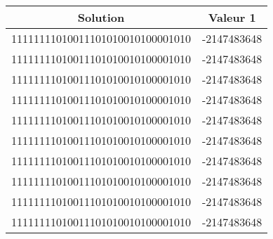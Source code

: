 \documentclass[a4paper,11pt]{article}
\begin{document}
	\begin{center}\begin{tabular}{|c|c|}
	\hline Solution & Valeur 1\\
	\hline 11111111010011101010010100001010 & -2147483648\\
	\hline 11111111010011101010010100001010 & -2147483648\\
	\hline 11111111010011101010010100001010 & -2147483648\\
	\hline 11111111010011101010010100001010 & -2147483648\\
	\hline 11111111010011101010010100001010 & -2147483648\\
	\hline 11111111010011101010010100001010 & -2147483648\\
	\hline 11111111010011101010010100001010 & -2147483648\\
	\hline 11111111010011101010010100001010 & -2147483648\\
	\hline 11111111010011101010010100001010 & -2147483648\\
	\hline 11111111010011101010010100001010 & -2147483648\\
	\hline
	\end{tabular}\end{center}
\end{document}
